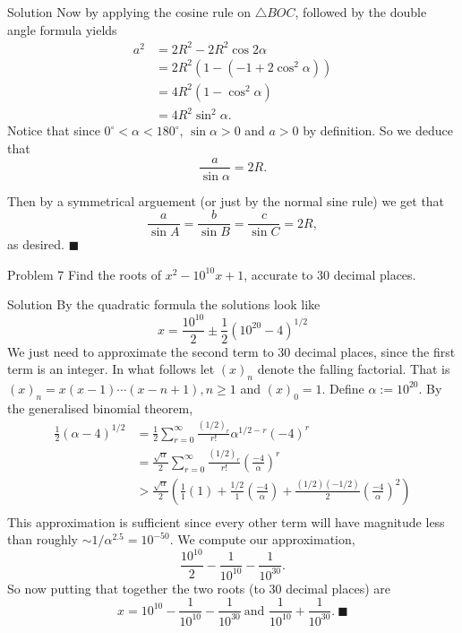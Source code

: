 \documentclass{article}
\begin{document}
\begin{solution}{Solution}
Now by applying the cosine rule on $\triangle BOC$, followed by the double
angle formula yields
\[
\begin{aligned}
a^2 &= 2R^2 - 2R^2 \cos 2\alpha\\
&= 2R^2 (1-(-1 + 2\cos^2 \alpha))\\
&= 4R^2(1-\cos^2 \alpha)\\
&= 4R^2 \sin^2 \alpha.
\end{aligned}
\]
Notice that since $0^\circ < \alpha < 180^\circ$, $\sin \alpha > 0$ and
$a > 0$ by definition.
So we deduce that
$$
\frac{a}{\sin\alpha} = 2R.
$$

Then by a symmetrical arguement (or just by the normal sine rule) we get
that
$$\frac{a}{\sin A} = \frac{b}{\sin B} = \frac{c}{\sin C} = 2R,$$
as desired. $\blacksquare$
\end{solution}
\newpage

\begin{problem}{Problem 7}
Find the roots of $x^2 - 10^{10}x + 1$, accurate to 30 decimal places.
\end{problem}

\begin{solution}{Solution}
By the quadratic formula the solutions look like
$$
x = \frac{10^{10}}{2} \pm \frac{1}{2} \left(10^{20} - 4\right)^{1/2}
$$
We just need to approximate the second term to 30 decimal places,
since the first term is an integer. In what follows let $(x)_n$ denote the
falling factorial.  That is $(x)_n = x(x-1)\cdots(x-n+1), n\geq 1$ and
$(x)_0 = 1$.
Define $\alpha := 10^{20}$. By the generalised binomial theorem,
\[
\begin{aligned}
\frac{1}{2}\left(\alpha - 4\right)^{1/2} &=\frac12
\sum_{r=0}^{\infty} \frac{(1/2)_r}{r!} \alpha^{1/2 - r} (-4)^r\\
&= \frac{\sqrt \alpha}{2} \sum_{r=0}^{\infty} \frac{(1/2)_r}{r!}
\left( \frac{-4}{\alpha} \right)^r\\
&> \frac{\sqrt \alpha}{2} \left(\frac{1}{1}(1) +
\frac{1/2}{1} \left(\frac{-4}{\alpha}\right) + \frac{(1/2)(-1/2)}{2}
\left(\frac{-4}{\alpha}\right)^2  \right)\\
\end{aligned}
\]
This approximation is sufficient since every other term will have magnitude
less than roughly $\sim 1/\alpha^{2.5} = 10^{-50}$. We compute our
approximation,
$$
\frac{10^{10}}{2} - \frac{1}{10^{10}} - \frac{1}{10^{30}}.
$$
So now putting that together the two roots (to 30 decimal places) are
$$
x = 10^{10} - \frac{1}{10^{10}} - \frac{1}{10^{30}}  \ \text{and }
\frac{1}{10^{10}} + \frac{1}{10^{30}}. \ \blacksquare
$$
\end{solution}
\newpage
\end{document}

